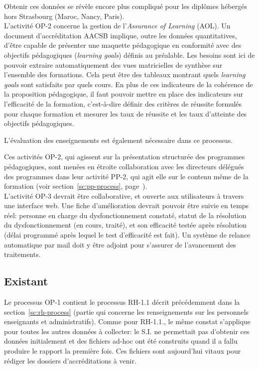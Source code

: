 \documentclass{book}
\begin{document}
Obtenir ces données se révèle encore plus compliqué pour les diplômes hébergés
hors Strasbourg (Maroc, Nancy, Paris).\\


L'activité OP-2 concerne la gestion de l'\emph{Assurance of Learning} (AOL).
Un document d'accréditation AACSB implique, outre les données quantitatives,
d'être capable de présenter une maquette pédagogique en conformité avec des
objectifs pédagogiques (\emph{learning goals}) définis au préalable. 
Les besoins sont ici de pouvoir extraire automatiquement des vues matricielles
de synthèse sur l'ensemble des formations. Cela peut être des tableaux montrant
quels \emph{learning goals} sont satisfaits par quels cours. 
En plus de ces indicateurs de la cohérence de la proposition pédagogique, il
faut pouvoir mettre en place des indicateurs sur l'efficacité de la formation,
c'est-à-dire définir des critères de réussite formulés pour chaque formation
et mesurer les taux de réussite et les taux d'atteinte des objectifs
pédagogiques.

L'évaluation des enseignements est également nécessaire dans ce processus.

Ces activités OP-2, qui agissent sur la présentation structurée des 
programmes pédagogiques, sont menées en étroite collaboration avec les directeurs
délégués des programmes dans leur activité PP-2, qui agit elle sur le contenu
même de la formation (voir section~\ref{sc:pp-process}, page~\pageref{sc:pp-process}).
\\

L'activité OP-3 devrait être collaborative, et ouverte aux utilisateurs à 
travers une interface web. Une fiche d'amélioration devrait pouvoir
être suivie en temps réel: personne en charge du dysfonctionnement constaté, 
statut de la résolution du dysfonctionnement (en cours, traité), et son 
efficacité testée après résolution (délai programmé après 
lequel le test d'efficacité est fait). Un système de relance automatique
par mail doit y être adjoint pour s'assurer de l'avancement des traitements.



\subsection{Existant}

Le processus OP-1 contient le processus RH-1.1 décrit précédemment dans la 
section~\ref{sc:rh-process} (partie qui concerne les renseignements sur les
personnels enseignants et administratifs). Comme pour RH-1.1., le même constat 
s'applique pour toutes les autres données à collecter: le S.I. ne permettait pas 
d'obtenir ces données initialement et des fichiers ad-hoc ont été construits quand 
il a fallu produire le rapport la première fois. Ces fichiers sont aujourd'hui vitaux pour
rédiger les dossiers d'accréditations à venir.\\
\end{document}
